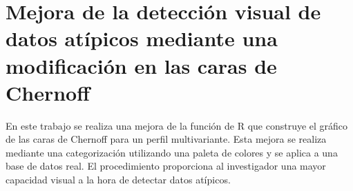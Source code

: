\chapter{Mejora de la detección visual de datos atípicos mediante una modificación en las caras de Chernoff}




En este trabajo se realiza una mejora de la función de R que construye el gráfico de las caras de Chernoff para un perfil multivariante. Esta mejora se realiza mediante una categorización utilizando una paleta de colores y se aplica a una base de datos real. El procedimiento proporciona al investigador una mayor capacidad visual a la hora de detectar datos atípicos.

%

%
